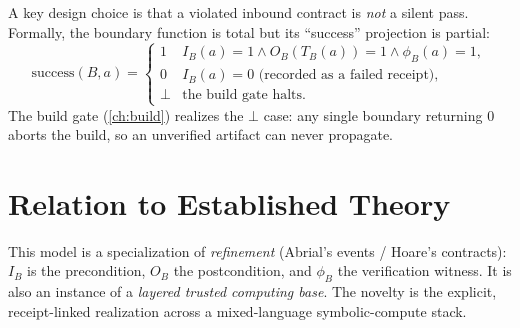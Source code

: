 A key design choice is that a violated inbound contract is \emph{not} a
silent pass. Formally, the boundary function is total but its ``success''
projection is partial:
\[
\text{success}(B,a) =
\begin{cases}
1 & I_B(a)=1 \wedge O_B(T_B(a))=1 \wedge \phi_B(a)=1,\\
0 & I_B(a)=0 \text{ (recorded as a failed receipt)},\\
\bot & \text{the build gate halts}.
\end{cases}
\]
The build gate (\cref{ch:build}) realizes the $\bot$ case: any single
boundary returning $0$ aborts the build, so an unverified artifact can never
propagate.

\section{Relation to Established Theory}
\label{sec:formal-rel}

This model is a specialization of \emph{refinement} (Abrial's events /
Hoare's contracts): $I_B$ is the precondition, $O_B$ the postcondition, and
$\phi_B$ the verification witness. It is also an instance of a
\emph{layered trusted computing base}. The novelty is the explicit,
receipt-linked realization across a mixed-language symbolic-compute stack.
